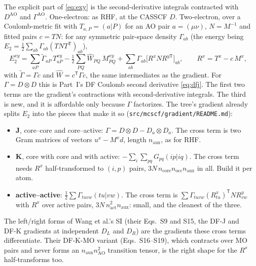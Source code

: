 \documentclass[11pt]{article}
\newcommand{\code}[1]{\texttt{#1}}
\begin{document}
The explicit part of \eqref{eq:exy} is the second-derivative integrals
contracted with $D^{\mathrm{AO}}$ and $\Gamma^{\mathrm{AO}}$. One-electron:
as RHF, at the CASSCF $D$. Two-electron, over a Coulomb-metric fit with
$T_{a,P} = (a|P)$ for an AO pair $a = (\mu\nu)$, $N = M^{-1}$ and fitted
pairs $c = TN$: for any symmetric pair-space density $\Gamma_{ab}$ (the
energy being $E_2 = \frac12\sum_{ab}\Gamma_{ab}(TNT^{\mathsf T})_{ab}$),
\begin{equation}
\boxed{\;
  E_2^{xy} = \sum_{aP}\tilde\Gamma_{aP}\,T^{xy}_{aP}
  - \tfrac12\sum_{PQ}\hat W_{PQ}\,M^{xy}_{PQ}
  + \sum_{ab}\Gamma_{ab}\bigl[R^x N R^{y\mathsf T}\bigr]_{ab},
  \qquad R^x = T^x - c\,M^x,\;}
  \label{eq:df2}
\end{equation}
with $\tilde\Gamma = \Gamma c$ and $\hat W = c^{\mathsf T}\Gamma c$, the
same intermediates as the gradient. For $\Gamma = D\otimes D$ this is
Part~I's DF Coulomb second derivative \eqref{eq:dfj}. The first two terms
are the gradient's contractions with second-derivative integrals. The third
is new, and it is affordable only because $\Gamma$ factorizes. The tree's
gradient already splits $E_2$ into the pieces that make it so
(\code{src/mcscf/gradient/README.md}):
\begin{itemize}
  \item \textbf{J}, core--core and core--active: $\Gamma = D\otimes D -
        D_a\otimes D_a$. The cross term is two Gram matrices of vectors
        $u^x - M^x d$, length $n_{\mathrm{aux}}$, as for RHF.
  \item \textbf{K}, core with core and with active: $-\sum_i\sum_{pq}
        G_{pq}(ip|iq)$. The cross term needs $R^x$ half-transformed to
        $(i, p)$ pairs, $3N\,n_{\mathrm{core}}n_{\mathrm{occ}}n_{\mathrm{aux}}$
        in all. Build it per atom.
  \item \textbf{active--active}: $\frac12\sum\Gamma_{tuvw}(tu|vw)$. The
        cross term is $\sum\Gamma_{tuvw}(R^x_{tu})^{\mathsf T}N R^y_{vw}$
        with $R^x$ over active pairs, $3N\,n_{\mathrm{act}}^2n_{\mathrm{aux}}$:
        small, and the cleanest of the three.
\end{itemize}
The left/right forms of Wang et al.'s SI (their Eqs.~S9 and S15, the DF-J
and DF-K gradients at independent $D_L$ and $D_R$) are the gradients these
cross terms differentiate. Their DF-K-MO variant (Eqs.~S16--S19), which
contracts over MO pairs and never forms an $n_{\mathrm{aux}}n_{\mathrm{AO}}^2$
transition tensor, is the right shape for the $R^x$ half-transforms too.
\end{document}
